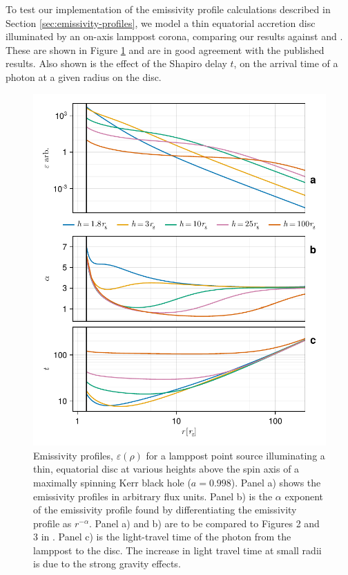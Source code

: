 \documentclass[fleqn,usenatbib]{mnras}
\begin{document}
To test our implementation of the emissivity profile calculations described in Section \ref{sec:emissivity-profiles}, we
model a thin equatorial accretion
disc illuminated by an on-axis lamppost corona, comparing our results against
\cite{wilkins_understanding_2012} and \cite{dauser_irradiation_2013}. These are
shown in Figure \ref{fig:emissivity-profiles} and are in good agreement with
the published results. Also shown is the effect of the Shapiro delay $t$, on the
arrival time of a photon at a given radius on the disc.

\begin{figure}
    \centering
    \includegraphics[width=0.99\linewidth]{figures/emissivity.point-source.pdf}
    \caption{Emissivity profiles, $\varepsilon(\rho)$ for a lamppost point source illuminating a thin, equatorial disc at various heights
        above the spin axis of a maximally spinning Kerr black hole ($a =
        0.998$). Panel a) shows the emissivity profiles in arbitrary flux units.
        Panel b) is the $\alpha$ exponent of the emissivity profile found by
        differentiating the emissivity profile as $r^{-\alpha}$.  Panel a) and
        b) are to be compared to Figures 2 and 3 in
        \citet{dauser_irradiation_2013}. Panel c) is the light-travel time of
        the photon from the lamppost to the disc. The increase in light travel
        time at small radii is due to the strong gravity effects.
}
    \label{fig:emissivity-profiles}
\end{figure}
\end{document}
